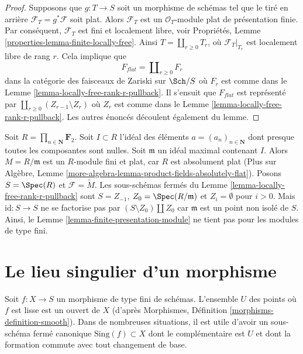 \begin{proof}
Supposons que  $g : T \to S$  soit un morphisme de schémas tel que le tiré en arrière
 $\mathcal{F}_T = g^*\mathcal{F}$  soit plat. Alors  $\mathcal{F}_T$  est un  $\mathcal{O}_T$-module plat de
présentation finie. Par conséquent,  $\mathcal{F}_T$  est fini et localement libre,
voir Propriétés, Lemme  \ref{properties-lemma-finite-locally-free}. Ainsi  $T = \coprod_{r \geq 0} T_r$, où  $\mathcal{F}_T|_{T_r}$  est
localement libre de rang  $r$. Cela implique que
$$
F_{flat} = \coprod\nolimits_{r \geq 0} F_r
$$
dans la catégorie des faisceaux de Zariski sur  $\Sch/S$  où  $F_r$  est
comme dans le Lemme  \ref{lemma-locally-free-rank-r-pullback}. Il s'ensuit que  $F_{flat}$  est représenté par
 $\coprod_{r \geq 0} (Z_{r - 1} \setminus Z_r)$  où  $Z_r$  est comme dans le Lemme  \ref{lemma-locally-free-rank-r-pullback}. Les autres
énoncés découlent également du lemme.
\end{proof}

\begin{example}
\label{example-not-fp-MB}
Soit  $R = \prod_{n \in \mathbf{N}} \mathbf{F}_2$. Soit  $I \subset R$  l'idéal des éléments  $a = (a_n)_{n \in \mathbf{N}}$  dont
presque toutes les composantes sont nulles. Soit  $\mathfrak m$  un idéal maximal
contenant  $I$. Alors  $M = R/\mathfrak m$  est un  $R$-module fini et
plat, car  $R$  est absolument plat (Plus sur Algèbre, Lemme  \ref{more-algebra-lemma-product-fields-absolutely-flat}).
Posons  $S = \Spec(R)$  et  $\mathcal{F} = \widetilde{M}$. Les sous-schémas fermés du Lemme  \ref{lemma-locally-free-rank-r-pullback} 
sont  $S = Z_{-1}$,  $Z_0 = \Spec(R/\mathfrak m)$ et  $Z_i = \emptyset$  pour  $i > 0$. Mais
 $\text{id} : S \to S$  ne se factorise pas par  $(S \setminus Z_0) \amalg Z_0$  car  $\mathfrak m$  est un point
non isolé de  $S$. Ainsi, le Lemme  \ref{lemma-finite-presentation-module}  ne tient pas pour les
modules de type fini.
\end{example}







\section{Le lieu singulier d'un morphisme}
\label{section-singular-locus-morphism}

\noindent
Soit  $f : X \to S$  un morphisme de type fini de schémas. L'ensemble  $U$ 
des points où  $f$  est lisse est un ouvert de  $X$  (d'après
Morphismes, Définition  \ref{morphisms-definition-smooth}). Dans de nombreuses situations, il est utile
d'avoir un sous-schéma fermé canonique  $\text{Sing}(f) \subset X$  dont le complémentaire est
 $U$  et dont la formation commute avec tout changement de base.

